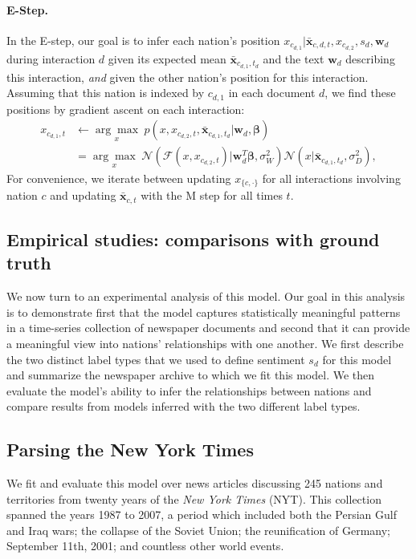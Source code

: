 \paragraph{E-Step.} In the E-step, our goal is to infer each nation's
position $x_{c_{d,1}} | \bm \bar{x}_{c,d,t}, x_{c_{d,2}}, s_d, \bm
w_d$ during interaction $d$ given its expected mean $\bm \bar
x_{c_{d,1},t_d}$ and the text $\bm w_d$ describing this interaction,
\emph{and} given the other nation's position for this interaction.
Assuming that this nation is indexed by $c_{d,1}$ in each document $d$, we
find these positions by gradient ascent on each interaction:
\begin{align}
  x_{c_{d, 1}, t} & \gets \underset{ x }
  {\arg \max}\hspace{3pt}
  p(x, x_{c_{d,2},t}, \bm \bar x_{c_{d,1},t_d} | \bm w_d, \bm \beta) \nonumber \\
  & = \underset{x}
  { \arg \max }\hspace{3pt}
  \mathcal{N}( \mathcal{F}(x, x_{c_{d,2},t}) | \bm w_d^T \bm \beta,
  \sigma_W^2 )
  \mathcal{N}( x | \bm \bar x_{c_{d,1},t_d}, \sigma_D^2 ),
\end{align}
For convenience, we iterate between updating $x_{\{c,\cdot\}}$ for all
interactions involving nation $c$ and updating $\bm \bar x_{c,t}$
with the M step for all times $t$.

\subsection{Empirical studies: comparisons with ground truth}
We now turn to an experimental analysis of this model.  Our goal in
this analysis is to demonstrate first that the model captures
statistically meaningful patterns in a time-series collection of
newspaper documents and second that it can provide a meaningful view
into nations' relationships with one another. We first describe the
two distinct label types that we used to define sentiment $s_d$ for
this model and summarize the newspaper archive to which we fit this
model.  We then evaluate the model's ability to infer the
relationships between nations and compare results from models
inferred with the two different label types.

\subsection*{Parsing the New York Times}

We fit and evaluate this model over news articles discussing 245
nations and territories from twenty years of the \emph{New York Times}
(NYT).  This collection spanned the years 1987 to 2007, a period which
included both the Persian Gulf and Iraq wars; the collapse of the
Soviet Union; the reunification of Germany; September 11th, 2001; and
countless other world events.

